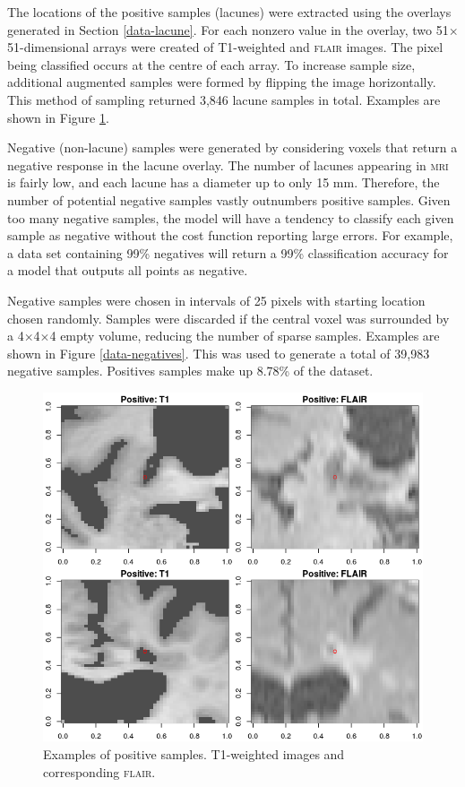 The locations of the positive samples (lacunes) were extracted using the overlays generated in Section \ref{data-lacune}. For each nonzero value in the overlay, two 51$\times$51-dimensional arrays were created of T1-weighted and \textsc{flair} images. The pixel being classified occurs at the centre of each array. To increase sample size, additional augmented samples were formed by flipping the image horizontally. This method of sampling returned 3,846 lacune samples in total. Examples are shown in Figure \ref{data-positives}.

Negative (non-lacune) samples were generated by considering voxels that return a negative response in the lacune overlay. The number of lacunes appearing in \textsc{mri} is fairly low, and each lacune has a diameter up to only 15 mm. Therefore, the number of potential negative samples vastly outnumbers positive samples. Given too many negative samples, the model will have a tendency to classify each given sample as negative without the cost function reporting large errors. For example, a data set containing 99\% negatives will return a 99\% classification accuracy for a model that outputs all points as negative.

Negative samples were chosen in intervals of 25 pixels with starting location chosen randomly. Samples were discarded if the central voxel was surrounded by a 4$\times$4$\times$4 empty volume, reducing the number of sparse samples. Examples are shown in Figure \ref{data-negatives}. This was used to generate a total of 39,983 negative samples. Positives samples make up 8.78\% of the dataset.

\begin{figure}[hb]
\centering
\includegraphics[width=\linewidth]{Images/6_positives.png}
\caption{Examples of positive samples. T1-weighted images and corresponding \textsc{flair}.}
\label{data-positives}
\end{figure}


